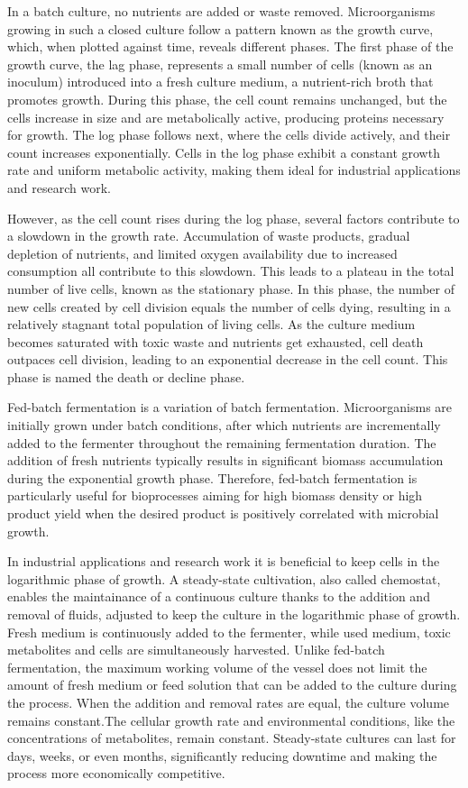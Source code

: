 In a batch culture, 
no nutrients are added or waste removed. Microorganisms growing in such a closed culture follow a pattern known as the 
growth curve, which, when plotted against time, reveals different phases.
The first phase of the growth curve, the lag phase, represents a small number of cells (known as an inoculum) introduced into a fresh culture medium, 
a nutrient-rich broth that promotes growth. During this phase, the cell count remains unchanged, but the cells increase 
in size and are metabolically active, producing proteins necessary for growth.
The log phase follows next, where the 
cells divide actively, and their count increases exponentially. Cells in the log 
phase exhibit a constant growth rate and uniform metabolic activity, making them ideal for industrial applications and research work.

However, as the cell count rises during the log phase, several factors contribute to a slowdown in the growth rate. 
Accumulation of waste products, gradual depletion of nutrients, and limited oxygen availability due to increased 
consumption all contribute to this slowdown. This leads to a plateau in the total number of live cells, known 
as the stationary phase. In this phase, the number of new cells created by cell division equals the number of 
cells dying, resulting in a relatively stagnant total population of living cells.
As the culture medium becomes saturated with toxic waste and nutrients get exhausted, cell death outpaces cell 
division, leading to an exponential decrease in the cell count. This phase is named the death or decline phase. \cite{2024Microbial}

Fed-batch fermentation is a variation of batch fermentation. Microorganisms are initially grown under batch conditions, after which nutrients 
are incrementally added to the fermenter throughout the remaining fermentation duration. The addition of fresh nutrients typically results in 
significant biomass accumulation during the exponential growth phase. Therefore, fed-batch fermentation 
is particularly useful for bioprocesses aiming for high biomass density or high product yield when the 
desired product is positively correlated with microbial growth. \cite{YangSha2019}

In industrial applications and research work it is beneficial to keep cells in the logarithmic phase of growth.
A steady-state cultivation, also called chemostat, enables the maintainance of a continuous 
culture thanks to the addition and removal of fluids, adjusted 
to keep the culture in the logarithmic phase of growth. \cite{2024Microbial} 
Fresh medium is continuously added to the fermenter, while used medium, toxic metabolites 
and cells are simultaneously harvested. Unlike fed-batch fermentation, the maximum working volume of 
the vessel does not limit the amount of fresh medium or feed solution that can be added to the 
culture during the process. When the addition and removal rates are equal, 
the culture volume remains constant.The cellular growth rate and environmental conditions, like the concentrations 
of metabolites, remain constant. Steady-state cultures can last for days, weeks, or even months, 
significantly reducing downtime and making the process more economically competitive. \cite{YangSha2019}

